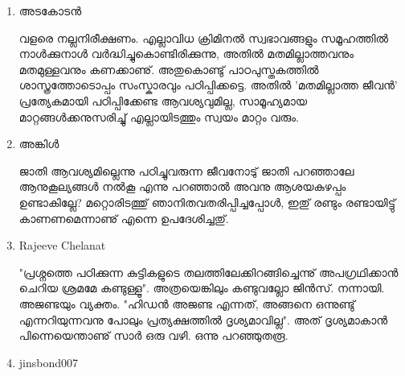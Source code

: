 \begin{enumerate}

\item{അടകോടന്‍}

വളരെ നല്ലനിരീക്ഷണം. എല്ലാവിധ ക്രിമിനല്‍ സ്വഭാവങ്ങളും സമൂഹത്തില്‍ നാള്‍ക്കുനാള്‍ വര്‍ദ്ധിച്ചുകൊണ്ടിരിക്കുന്നു, 
അതില്‍ മതമില്ലാത്തവനും മതമുള്ളവനും കണക്കാണു്. അതുകൊണ്ടു് പാഠപുസ്തകത്തില്‍ ശാസ്ത്രത്തോടൊപ്പം സംസ്കാരവും 
പഠിപ്പിക്കട്ടെ. അതില്‍ 'മതമില്ലാത്ത ജീവന്‍' പ്രത്യേകമായി പഠിപ്പിക്കേണ്ട ആവശ്യവുമില്ല, സാമൂഹ്യമായ മാറ്റങ്ങള്‍ക്കനുസരിച്ചു് 
എല്ലായിടത്തും സ്വയം മാറ്റം വരും.

\item{അങ്കിള്‍}

ജാതി ആവശ്യമില്ലെന്നു പഠിച്ചുവരുന്ന ജീവനോടു് ജാതി പറഞ്ഞാലേ ആനുകൂല്യങ്ങള്‍ നല്‍കൂ എന്നു പറഞ്ഞാല്‍ അവനു 
ആശയകുഴപ്പം ഉണ്ടാകില്ലേ? മറ്റൊരിടത്തു് ഞാനിതവതരിപ്പിച്ചപ്പോള്‍, ഇതു് രണ്ടും രണ്ടായിട്ടു് കാണണമെന്നാണു് എന്നെ 
ഉപദേശിച്ചതു്.

\item{Rajeeve Chelanat}

"പ്രശ്നത്തെ പഠിക്കുന്ന കുട്ടികളുടെ തലത്തിലേക്കിറങ്ങിച്ചെന്നു് അപഗ്രഥിക്കാന്‍ ചെറിയ ശ്രമമേ കണ്ടുള്ളൂ". അത്രയെങ്കിലും 
കണ്ടുവല്ലോ ജിന്‍സ്. നന്നായി. അജണ്ടയും വ്യക്തം. "ഹിഡന്‍ അജണ്ട എന്നത്, അങ്ങനെ ഒന്നുണ്ടു് എന്നറിയുന്നവനു 
പോലും പ്രത്യക്ഷത്തില്‍ ദൃശ്യമാവില്ല". അത് ദൃശ്യമാകാന്‍ പിന്നെയെന്താണു് സാര്‍ ഒരു വഴി. ഒന്നു പറഞ്ഞുതരൂ.

\item{jinsbond007}


\end{enumerate}
